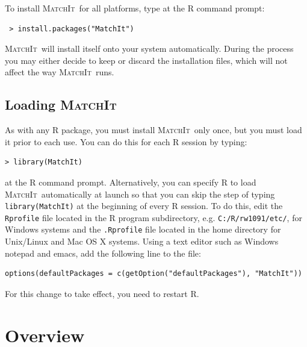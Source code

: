 \documentclass[oneside,letterpaper,titlepage]{article}
\newcommand{\MatchIt}{\textsc{MatchIt}}
\begin{document}
To install \MatchIt\ for all platforms, type at the R command prompt:
\begin{verbatim}
 > install.packages("MatchIt")
\end{verbatim}

  \noindent \MatchIt\ will install itself onto your system
  automatically.  During the process you may either decide to keep or
  discard the installation files, which will not affect the way
  \MatchIt\ runs.

\subsection{Loading \MatchIt}
As with any R package, you must install \MatchIt\ only once, but you
must load it prior to each use.  You can do this for each R session by
typing:
\begin{verbatim}
> library(MatchIt) 
\end{verbatim}
at the R command prompt.  Alternatively, you can specify R to load
\MatchIt\ automatically at launch so that you can skip the step of
typing {\tt library(MatchIt)} at the beginning of every R session.  To
do this, edit the {\tt Rprofile} file located in the R program
subdirectory, e.g. \texttt{C:/R/rw1091/etc/}, for Windows systems and
the {\tt .Rprofile} file located in the home directory for Unix/Linux
and Mac OS X systems.  Using a text editor such as Windows notepad and
emacs, add the following line to the file:
\begin{verbatim}
options(defaultPackages = c(getOption("defaultPackages"), "MatchIt"))
\end{verbatim}
For this change to take effect, you need to restart R.

%



\section{Overview}
\end{document}

